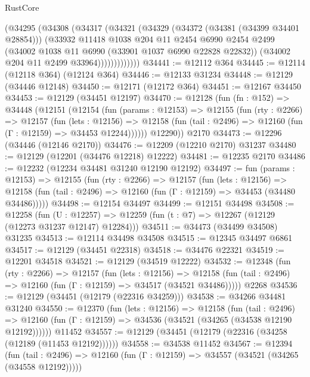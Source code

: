 \begin{lexlean}{RustCore}
\begin{coremodule}
                (@34295
                  (@34308
                    (@34317
                      (@34321
                        (@34329
                          (@34372 (@34381 (@34399 @34401 @28854)))
                          (@33932
                            @11418
                            @1038
                            @204
                            @11
                            @2454
                            @6990
                            @2454
                            @2499
                            (@34002 @1038 @11 @6990 (@33901 @1037 @6990 @22828 @22832))
                            (@34002 @204 @11 @2499 @33964)))))))))))))
@34441 := @12112 @364
@34445 := @12114 (@12118 @364) (@12124 @364)
@34446 := @12133 @31234
@34448 := @12129 (@34446 @12148)
@34450 := @12171 (@12172 @364)
@34451 := @12167 @34450
@34453 := @12129 (@34451 @12197)
@34470 := @12128
    (fun (fn : @152) =>
    @34448
      (@12151
        (@12154
          (fun (params : @12153) =>
          @12155
            (fun (rty : @2266) =>
            @12157
              (fun (lets : @12156) =>
              @12158 (fun (tail : @2496) => @12160 (fun (Γ : @12159) => @34453 @12244))))))
        @12290))
    @2170
@34473 := @12296 (@34446 (@12146 @2170))
@34476 := @12209 (@12210 @2170) @31237
@34480 := @12129 (@12201 (@34476 @12218) @12222)
@34481 := @12235 @2170
@34486 := @12232 (@12234 @34481 @31240 @12190 @12192)
@34497 := fun (params : @12153) =>
  @12155
    (fun (rty : @2266) =>
    @12157
      (fun (lets : @12156) =>
      @12158 (fun (tail : @2496) => @12160 (fun (Γ : @12159) => @34453 (@34480 @34486)))))
@34498 := @12154 @34497
@34499 := @12151 @34498
@34508 := @12258
    (fun (U : @12257) => @12259 (fun (t : @7) => @12267 (@12129 (@12273 @31237 @12147) @12284)))
@34511 := @34473 (@34499 @34508) @31235
@34513 := @12114 @34498 @34508
@34515 := @12345 @34497 @6861
@34517 := @12129 (@34451 @22318)
@34518 := @34476 @22321
@34519 := @12201 @34518
@34521 := @12129 (@34519 @12222)
@34532 := @12348
    (fun (rty : @2266) =>
    @12157
      (fun (lets : @12156) =>
      @12158 (fun (tail : @2496) => @12160 (fun (Γ : @12159) => @34517 (@34521 @34486)))))
    @2268
@34536 := @12129 (@34451 (@12179 (@22316 @34259)))
@34538 := @34266 @34481 @31240
@34550 := @12370
    (fun (lets : @12156) =>
    @12158
      (fun (tail : @2496) =>
      @12160 (fun (Γ : @12159) => @34536 (@34521 (@34265 (@34538 @12190 @12192))))))
    @11452
@34557 := @12129 (@34451 (@12179 (@22316 (@34258 (@12189 (@11453 @12192))))))
@34558 := @34538 @11452
@34567 := @12394
    (fun (tail : @2496) => @12160 (fun (Γ : @12159) => @34557 (@34521 (@34265 (@34558 @12192)))))

\end{coremodule}
\end{lexlean}
